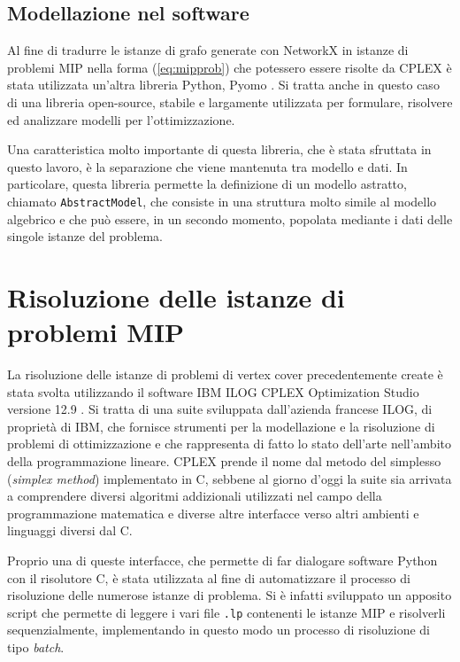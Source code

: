 \subsection{Modellazione nel software}
Al fine di tradurre le istanze di grafo generate con NetworkX in istanze di problemi MIP nella forma (\ref{eq:mipprob}) che potessero essere risolte da CPLEX è stata utilizzata un'altra libreria Python, Pyomo \cite{bynum2021pyomo}\cite{hart2011pyomo}. Si tratta anche in questo caso di una libreria open-source, stabile e largamente utilizzata per formulare, risolvere ed analizzare modelli per l'ottimizzazione.

Una caratteristica molto importante di questa libreria, che è stata sfruttata in questo lavoro, è la separazione che viene mantenuta tra modello e dati.
In particolare, questa libreria permette la definizione di un modello astratto, chiamato \texttt{AbstractModel}, che consiste in una struttura molto simile al modello algebrico e che può essere, in un secondo momento, popolata mediante i dati delle singole istanze del problema.




 


\section{Risoluzione delle istanze di problemi MIP}
La risoluzione delle istanze di problemi di vertex cover precedentemente create è stata svolta utilizzando il software IBM ILOG CPLEX Optimization Studio versione 12.9 \cite{cplex}. Si tratta di una suite sviluppata dall'azienda francese ILOG, di proprietà di IBM, che fornisce strumenti per la modellazione e la risoluzione di problemi di ottimizzazione e che rappresenta di fatto lo stato dell'arte nell'ambito della programmazione lineare. CPLEX prende il nome dal metodo del simplesso (\textit{simplex method}) implementato in C, sebbene al giorno d'oggi la suite sia arrivata a comprendere diversi algoritmi addizionali utilizzati nel campo della programmazione matematica e diverse altre interfacce verso altri ambienti e linguaggi diversi dal C.  

Proprio una di queste interfacce,  che permette di far dialogare software Python con il risolutore C, è stata utilizzata al fine di automatizzare il processo di risoluzione delle numerose istanze di problema. Si è infatti sviluppato un apposito script che permette di leggere i vari file \texttt{.lp} contenenti le istanze MIP e risolverli sequenzialmente, implementando in questo modo un processo di risoluzione di tipo \textit{batch}. 

